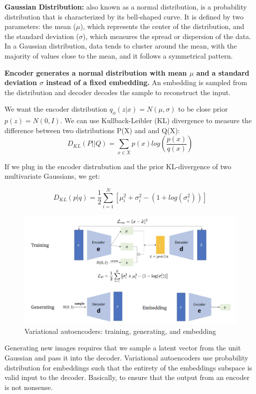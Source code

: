 \begin{definition}
    \textbf{Gaussian Distribution:} also known as a normal distribution, is a probability distribution that is characterized by its bell-shaped curve. It is defined by two parameters: the mean (\(\mu\)), which represents the center of the distribution, and the standard deviation (\(\sigma\)), which measures the spread or dispersion of the data. In a Gaussian distribution, data tends to cluster around the mean, with the majority of values close to the mean, and it follows a symmetrical pattern.
\end{definition}

\textbf{Encoder generates a normal distribution with mean \(\mu\) and a standard deviation \(\sigma\) instead of a fixed embedding.} An embedding is sampled from the distribution and decoder decodes the sample to
reconstruct the input.

We want the encoder distribution \( q_\phi (z|x) = N(\mu, \sigma)\) to be close prior \( p(z) = N(0, I)\). We can use Kullback-Leibler (KL) divergence to measure the difference between two distributions P(X) and and Q(X):
\[ D_{KL}(P||Q) = \sum_{x \in X}p(x)log(\frac{p(x)}{q(x)})\]

If we plug in the encoder distrubution and the prior KL-divergence of two multivariate Gaussians, we get: 

\[ D_{KL}(p|q) = \frac{1}{2} \sum_{i = 1}^{N}[\mu^2_i + \sigma^2_i - (1 + log(\sigma^2_i))] \]

\begin{figure}[h!t]
    \centering
    \includegraphics[width=0.55\linewidth]{vae2.png}
    \caption{Variational autoencoders: training, generating, and embedding}
    \label{fig:enter-label}
\end{figure}

\begin{idea}
    Generating new images requires that we sample a latent vector from the unit Gaussian and pass it into the decoder. Variational autoencoders use probability distribution for embeddings such that the entirety of the embeddings subspace is valid input to the decoder. Basically, to ensure that the output from an encoder is not nonsense.
\end{idea}

